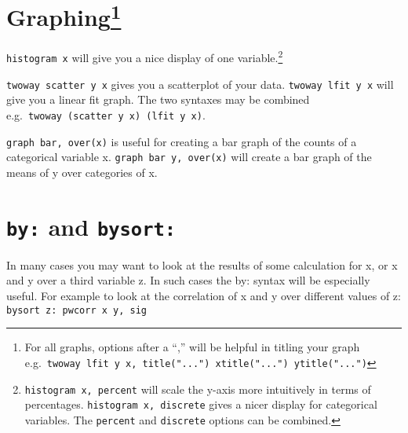 \documentclass[
]{report}
\begin{document}
\hypertarget{graphinggraph-options}{%
\section[Graphing]{\texorpdfstring{Graphing\footnote{For all graphs,
  options after a ``,'' will be helpful in titling your graph
  e.g.~\texttt{twoway\ lfit\ y\ x,\ title("...")\ xtitle("...")\ ytitle("...")}}}{Graphing}}\label{graphinggraph-options}}

\texttt{histogram\ x} will give you a nice display of one
variable.\footnote{\texttt{histogram\ x,\ percent} will scale the y-axis
  more intuitively in terms of percentages.
  \texttt{histogram\ x,\ discrete} gives a nicer display for categorical
  variables. The \texttt{percent} and \texttt{discrete} options can be
  combined.}

\texttt{twoway\ scatter\ y\ x} gives you a scatterplot of your data.
\texttt{twoway\ lfit\ y\ x} will give you a linear fit graph. The two
syntaxes may be combined
e.g.~\texttt{twoway\ (scatter\ y\ x)\ (lfit\ y\ x)}.

\texttt{graph\ bar,\ over(x)} is useful for creating a bar graph of the
counts of a categorical variable x. \texttt{graph\ bar\ y,\ over(x)}
will create a bar graph of the means of y over categories of x.

\hypertarget{by-and-bysort}{%
\section{\texorpdfstring{\texttt{by:} and
\texttt{bysort:}}{by: and bysort:}}\label{by-and-bysort}}

In many cases you may want to look at the results of some calculation
for x, or x and y over a third variable z. In such cases the by: syntax
will be especially useful. For example to look at the correlation of x
and y over different values of z:
\texttt{bysort\ z:\ pwcorr\ x\ y,\ sig}
\end{document}
